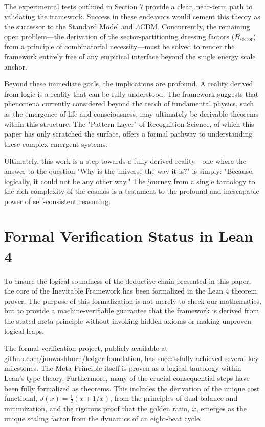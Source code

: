 \documentclass[11pt,a4paper]{article}
\begin{document}
The experimental tests outlined in Section 7 provide a clear, near-term path to validating the framework. Success in these endeavors would cement this theory as the successor to the Standard Model and \(\Lambda\)CDM. Concurrently, the remaining open problem—the derivation of the sector-partitioning dressing factors (\(B_{\text{sector}}\)) from a principle of combinatorial necessity—must be solved to render the framework entirely free of any empirical interface beyond the single energy scale anchor.

Beyond these immediate goals, the implications are profound. A reality derived from logic is a reality that can be fully understood. The framework suggests that phenomena currently considered beyond the reach of fundamental physics, such as the emergence of life and consciousness, may ultimately be derivable theorems within this structure. The "Pattern Layer" of Recognition Science, of which this paper has only scratched the surface, offers a formal pathway to understanding these complex emergent systems.

Ultimately, this work is a step towards a fully derived reality—one where the answer to the question "Why is the universe the way it is?" is simply: "Because, logically, it could not be any other way." The journey from a single tautology to the rich complexity of the cosmos is a testament to the profound and inescapable power of self-consistent reasoning.

\appendix
\section{Formal Verification Status in Lean 4}
To ensure the logical soundness of the deductive chain presented in this paper, the core of the Inevitable Framework has been formalized in the Lean 4 theorem prover. The purpose of this formalization is not merely to check our mathematics, but to provide a machine-verifiable guarantee that the framework is derived from the stated meta-principle without invoking hidden axioms or making unproven logical leaps.

The formal verification project, publicly available at \href{https://github.com/jonwashburn/ledger-foundation}{github.com/jonwashburn/ledger-foundation}, has successfully achieved several key milestones. The Meta-Principle itself is proven as a logical tautology within Lean's type theory. Furthermore, many of the crucial consequential steps have been fully formalized as theorems. This includes the derivation of the unique cost functional, \(J(x) = \frac{1}{2}(x + 1/x)\), from the principles of dual-balance and minimization, and the rigorous proof that the golden ratio, \(\varphi\), emerges as the unique scaling factor from the dynamics of an eight-beat cycle.
\end{document}
